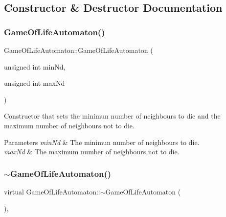 \subsection{Constructor \& Destructor Documentation}
\mbox{\label{class_game_of_life_automaton_a9d9a437e1f57f13a5ad9cc1c3d441ddf}} 
\subsubsection{\texorpdfstring{Game\+Of\+Life\+Automaton()}{GameOfLifeAutomaton()}}
{\footnotesize\ttfamily Game\+Of\+Life\+Automaton\+::\+Game\+Of\+Life\+Automaton (\begin{DoxyParamCaption}\item[{unsigned int}]{min\+Nd,  }\item[{unsigned int}]{max\+Nd }\end{DoxyParamCaption})\hspace{0.3cm}{\ttfamily [inline]}}

Constructor that sets the minimun number of neighbours to die and the maximum number of neighbours not to die.


\begin{DoxyParams}{Parameters}
{\em min\+Nd} & The minimun number of neighbours to die. \\
\hline
{\em max\+Nd} & The maximum number of neighbours not to die. \\
\hline
\end{DoxyParams}
\mbox{\label{class_game_of_life_automaton_a3f4ab2012723f8d5eb587a569c91c6ad}} 
\subsubsection{\texorpdfstring{$\sim$\+Game\+Of\+Life\+Automaton()}{~GameOfLifeAutomaton()}}
{\footnotesize\ttfamily virtual Game\+Of\+Life\+Automaton\+::$\sim$\+Game\+Of\+Life\+Automaton (\begin{DoxyParamCaption}{ }\end{DoxyParamCaption})\hspace{0.3cm}{\ttfamily [inline]}, {\ttfamily [virtual]}}

